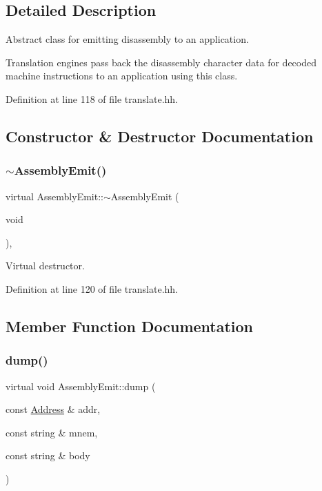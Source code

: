 \subsection{Detailed Description}
Abstract class for emitting disassembly to an application. 

Translation engines pass back the disassembly character data for decoded machine instructions to an application using this class. 

Definition at line 118 of file translate.\+hh.



\subsection{Constructor \& Destructor Documentation}
\mbox{\label{class_assembly_emit_aa5cf778a309d1b52a4be31ea745ad5af}} 
\subsubsection{\texorpdfstring{$\sim$AssemblyEmit()}{~AssemblyEmit()}}
{\footnotesize\ttfamily virtual Assembly\+Emit\+::$\sim$\+Assembly\+Emit (\begin{DoxyParamCaption}\item[{void}]{ }\end{DoxyParamCaption})\hspace{0.3cm}{\ttfamily [inline]}, {\ttfamily [virtual]}}



Virtual destructor. 



Definition at line 120 of file translate.\+hh.



\subsection{Member Function Documentation}
\mbox{\label{class_assembly_emit_afdb4c90bde30480659ad4eaa49bd1487}} 
\subsubsection{\texorpdfstring{dump()}{dump()}}
{\footnotesize\ttfamily virtual void Assembly\+Emit\+::dump (\begin{DoxyParamCaption}\item[{const \mbox{\hyperlink{class_address}{Address}} \&}]{addr,  }\item[{const string \&}]{mnem,  }\item[{const string \&}]{body }\end{DoxyParamCaption})\hspace{0.3cm}{\ttfamily [pure virtual]}}




